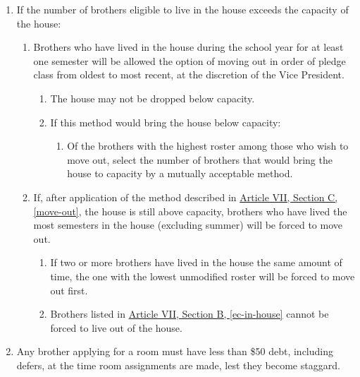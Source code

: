 	\begin{enumerate}
		\item If the number of brothers eligible to live in the house exceeds the capacity of the house:
			
			\begin{enumerate}
				\item Brothers who have lived in the house during the school year for at least one semester will be allowed the option of moving out in order of pledge class from oldest to most recent, at the discretion of the Vice President. \label{move-out}

					\begin{enumerate}
						\item The house may not be dropped below capacity.

						\item If this method would bring the house below capacity: 
							\begin{enumerate}
								\item Of the brothers with the highest \gls{roster} among those who wish to move out, select the number of brothers that would bring the house to capacity by a mutually acceptable method.
							\end{enumerate}
					\end{enumerate}

				\item If, after application of the method described in \hyperref[move-out]{Article VII, Section C, \autoref*{move-out}}, the house is still above capacity, brothers who have lived the most semesters in the house (excluding summer) will be forced to move out.
					
					\begin{enumerate}
						\item If two or more brothers have lived in the house the same amount of time, the one with the lowest unmodified \gls{roster} will be forced to move out first.

						\item Brothers listed in \hyperref[ec-in-house]{Article VII, Section B, \autoref*{ec-in-house}} cannot be forced to live out of the house.
					\end{enumerate}
			\end{enumerate}

		\item Any brother applying for a room must have less than \$50 debt, including \glspl{defer}, at the time room assignments are made, lest they become \gls{staggard}.


\end{enumerate}
